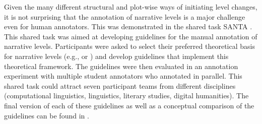 \documentclass[10pt, a4paper]{article}
\newcommand{\sina}[1]{\textit{\textcolor{blue}{sina: #1}}}
\begin{document}
Given the many different structural and plot-wise ways of initiating level changes, it is not surprising that the annotation of narrative levels is a major challenge even for human annotators. This was demonstrated in the shared task SANTA \cite[Systematic Analysis of Narrative Texts through Annotation]{Gius2019aa,Gius:2021tj}. This shared task was aimed at developing guidelines for the manual annotation of narrative levels. Participants were asked to select their preferred theoretical basis for narrative levels (e.g.,  or ) and develop guidelines that implement this theoretical framework. The guidelines were then evaluated in an annotation experiment with multiple student annotators who annotated in parallel. This shared task could attract seven participant teams from different disciplines (computational linguistics, linguistics, literary studies, digital humanities). The final version of each of these guidelines as well as a conceptual comparison of the guidelines can be found in .










\end{document}
